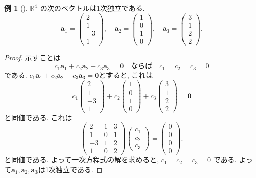 \documentclass[dvipdfmx,a4paper,11pt]{article} %
\theoremstyle{definition}
\newtheorem{eg}[thm]{例}
\begin{document}
\begin{eg}[{\cite[例題4.2.1]{M}}] 
$\mathbb{R}^4$ の次のベクトルは1次独立である. 
\[
\bm{a}_1=
\begin{pmatrix}
2\\
1\\
-3\\
1
\end{pmatrix},
\quad
\bm{a}_2=
\begin{pmatrix}
1\\
0\\
1\\
0
\end{pmatrix},
\quad
\bm{a}_3=
\begin{pmatrix}
3\\
1\\
2\\
2
\end{pmatrix}.
\]
\begin{proof}
示すことは
$$
c_1\bm{a}_1+c_2\bm{a}_2+c_3\bm{a}_3=\bm{0} 
\quad \text{ならば} \quad
c_1= c_2= c_3=0
$$
である. 
$c_1\bm{a}_1+c_2\bm{a}_2+c_3\bm{a}_3=\bm{0}$とすると, これは
\[
c_1
\begin{pmatrix}
2\\
1\\
-3\\
1
\end{pmatrix}
+
c_2
\begin{pmatrix}
1\\
0\\
1\\
0
\end{pmatrix}
+
c_3
\begin{pmatrix}
3\\
1\\
2\\
2
\end{pmatrix}
=\bm{0}
\]
と同値である. 
これは
\[
\begin{pmatrix}
2&1&3\\
1&0&1\\
-3&1&2\\
1&0&2
\end{pmatrix}
\begin{pmatrix}
c_1\\
c_2\\
c_3
\end{pmatrix}
=
\begin{pmatrix}
0\\
0\\
0\\
0
\end{pmatrix}.
\]
と同値である. 
よって一次方程式の解を求めると, 
\(
c_1=c_2=c_3=0
\)
である. よって\(
\bm{a}_1,\bm{a}_2,\bm{a}_3
\)は1次独立である.
\end{proof}
\end{eg}
\end{document}
